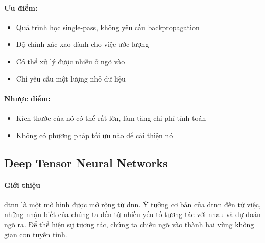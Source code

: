 \paragraph{Ưu điểm:}
\begin{itemize}
	\item Quá trình học single-pass, không yêu cầu backpropagation
	\item Độ chính xác xao dành cho việc ước lượng
	\item Có thể xử lý được nhiễu ở ngõ vào 
	\item Chỉ yêu cầu một lượng nhỏ dữ liệu
\end{itemize}
\paragraph{Nhược điểm:}
\begin{itemize}
	\item Kích thước của nó có thể rất lớn, làm tăng chi phí tính toán
	\item Không có phương pháp tối ưu nào để cải thiện nó
\end{itemize}

\subsection{Deep Tensor Neural Networks \cite{Yu2012LargeVS}}
\paragraph{Giới thiệu}
\ac{dtnn} là một mô hình được mở rộng từ \ac{dnn}. Ý tưởng cơ bản của \ac{dtnn} đến từ việc, những nhận biết của chúng ta đến từ nhiều yếu tố tương tác với nhau và dự đoán ngõ ra. Để thể hiện sự tương tác, chúng ta chiếu ngõ vào thành hai vùng không gian con tuyến tính.
